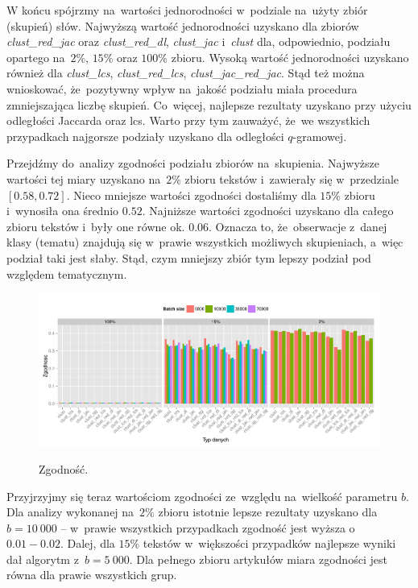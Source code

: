 \documentclass{praca1}
\begin{document}
W końcu spójrzmy na~wartości jednorodności w~podziale na~użyty zbiór (skupień) słów. Najwyższą wartość jednorodności uzyskano dla zbiorów \emph{clust\_red\_jac} oraz \emph{clust\_red\_dl}, \emph{clust\_jac} i~\emph{clust} dla, odpowiednio, podziału opartego na~$2\%$, $15\%$ oraz $100\%$ zbioru. Wysoką wartość jednorodności uzyskano również dla \emph{clust\_lcs}, \emph{clust\_red\_lcs}, \emph{clust\_jac\_red\_jac}. Stąd też można wnioskować, że~pozytywny wpływ na~jakość podziału miała procedura zmniejszająca liczbę skupień. Co~więcej, najlepsze rezultaty uzyskano przy użyciu odległości Jaccarda oraz lcs. Warto przy tym zauważyć, że~we wszystkich przypadkach najgorsze podziały uzyskano dla odległości $q$-gramowej.

Przejdźmy do~analizy zgodności podziału zbiorów na~skupienia. Najwyższe wartości tej miary uzyskano na~$2\%$ zbioru tekstów i~zawierały się w~przedziale $[0.58, 0.72]$. Nieco mniejsze wartości zgodności dostaliśmy dla $15\%$ zbioru i~wynosiła ona średnio $0.52$. Najniższe wartości zgodności uzyskano dla całego zbioru tekstów i~były one równe ok. $0.06$. Oznacza to, że~obserwacje z~danej klasy (tematu) znajdują się w~prawie wszystkich możliwych skupieniach, a~więc podział taki jest słaby. Stąd, czym mniejszy zbiór tym lepszy podział pod względem tematycznym.

\begin{figure}[!h]
  \centering
  \includegraphics[width=400pt]{plot11.pdf}\\
  \caption{Zgodność.}\label{plot:006}
\end{figure}

Przyjrzyjmy się teraz wartościom zgodności ze~względu na~wielkość parametru $b$. Dla analizy wykonanej na~$2\%$ zbioru istotnie lepsze rezultaty uzyskano dla $b = 10\ 000$ -- w~prawie wszystkich przypadkach zgodność jest wyższa o~$0.01-0.02$. Dalej, dla $15\%$ tekstów w~większości przypadków najlepsze wyniki dał algorytm z~$b = 5\ 000$. Dla pełnego zbioru artykułów miara zgodności jest równa dla prawie wszystkich grup.
\end{document}
